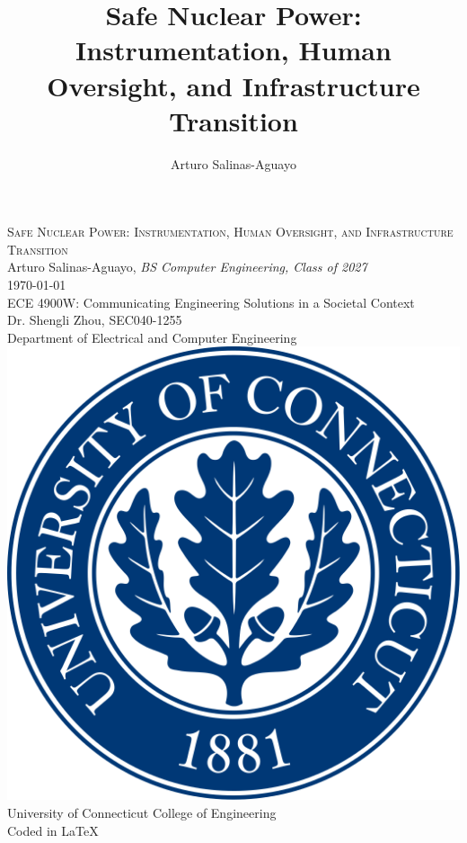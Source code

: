 \documentclass[12pt]{article}
\title{\bfseries\LARGE Safe Nuclear Power: Instrumentation, Human Oversight, and Infrastructure Transition}
\author{Arturo Salinas-Aguayo}
\begin{document}
\begin{titlepage}
    \centering
    \vspace*{3cm}
    {\Large \textsc{Safe Nuclear Power: Instrumentation, Human Oversight, and Infrastructure Transition}}\\
		Arturo Salinas-Aguayo, \textit{BS Computer Engineering, Class of 2027}\\
		\today\\
    \vspace{1.5cm}
    ECE 4900W: Communicating Engineering Solutions in a Societal Context\\
    Dr. Shengli Zhou, SEC040-1255\\
    Department of Electrical and Computer Engineering\\
    \vfill
    \includegraphics[scale=0.1]{uconnlogo}\\[1em]
    University of Connecticut College of Engineering\\
    \small\tiny{Coded in \LaTeX} \\
    \vspace{1cm}
\end{titlepage}
\newpage

\tableofcontents

\newpage
\end{document}
